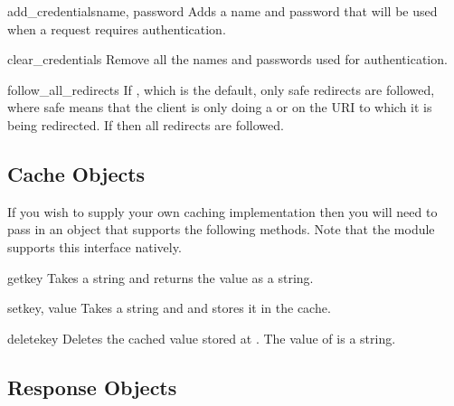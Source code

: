 \begin{methoddesc}[Http]{add_credentials}{name, password}
Adds a name and password that will be used when a request 
requires authentication.
\end{methoddesc}

\begin{methoddesc}[Http]{clear_credentials}{}
Remove all the names and passwords used for authentication.
\end{methoddesc}

\begin{memberdesc}[Http]{follow_all_redirects}
If , which is the default, only safe redirects are followed, where
safe means that the client is only doing a  or  on the
URI to which it is being redirected. If  then all redirects are followed.
\end{memberdesc}





\subsection{Cache Objects}
\label{cache-objects}

If you wish to supply your own caching implementation
then you will need to pass in an object that supports the 
following methods. Note that the  module
supports this interface natively.

\begin{methoddesc}[Cache]{get}{key}
Takes a string  and returns the value as a string.
\end{methoddesc}

\begin{methoddesc}[Cache]{set}{key, value}
Takes a string  and  and stores it in the cache.
\end{methoddesc}

\begin{methoddesc}[Cache]{delete}{key}
Deletes the cached value stored at . The value
of  is a string.
\end{methoddesc}





\subsection{Response Objects}
\label{response-objects}

